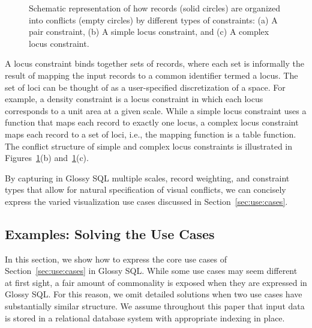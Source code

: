 \documentclass[11pt, oneside]{report}
\begin{document}
{\begin{figure}[t]
\centering
{}
\caption{Schematic representation of how records (solid circles) are organized into conflicts (empty circles) by different types of constraints: (a) A pair constraint, (b) A simple locus constraint, and (c) A complex locus constraint.} 
\label{fig:constraints:schematic}
\end{figure}

A locus constraint binds together sets of records, where each set is informally the result of mapping the input records to a common identifier termed a locus. The set of loci can be thought of as a user-specified discretization of a space. For example, a density constraint is a locus constraint in which each locus corresponds to a unit area at a given scale. While a simple locus constraint uses a function that maps each record to exactly one locus, a complex locus constraint maps each record to a set of loci, i.e., the mapping function is a table function. The conflict structure of simple and complex locus constraints is illustrated in Figures~\ref{fig:constraints:schematic}(b) and~\ref{fig:constraints:schematic}(c).

By capturing in Glossy SQL multiple scales, record weighting, and constraint types that allow for natural specification of visual conflicts, we can concisely express the varied visualization use cases discussed in Section~\ref{sec:use:cases}.

\subsection{Examples: Solving the Use Cases}
\label{sec:use:cases:solved}

In this section, we show how to express the core use cases of Section~\ref{sec:use:cases} in Glossy SQL. While some use cases may seem different at first sight, a fair amount of commonality is exposed when they are expressed in Glossy SQL. For this reason, we omit detailed solutions when two use cases have substantially similar structure. 
We assume throughout this paper that input data is stored in a relational database system with appropriate indexing in place.  

}
\end{document}
